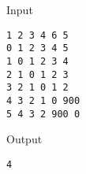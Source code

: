Input
\begin{verbatim}
1 2 3 4 6 5
0 1 2 3 4 5
1 0 1 2 3 4
2 1 0 1 2 3
3 2 1 0 1 2
4 3 2 1 0 900
5 4 3 2 900 0\end{verbatim}

Output
\begin{verbatim}
4\end{verbatim}